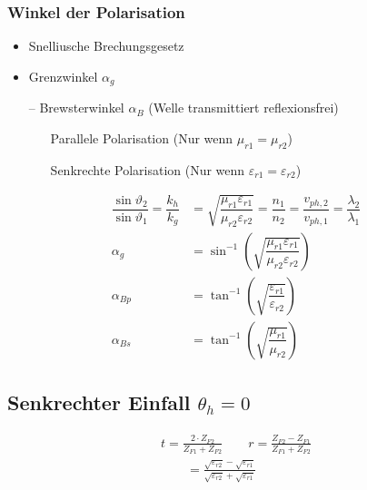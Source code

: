 


\subsubsection{Winkel der Polarisation}
\begin{itemize}
    \item Snelliusche Brechungsgesetz
    \item Grenzwinkel $\alpha_g$
    \item[--] Brewsterwinkel $\alpha_B$ (Welle transmittiert reflexionsfrei)
          \begin{itemize}
              \item[\textbullet] Parallele Polarisation (Nur wenn $\mu_{r1} = \mu_{r2}$)
              \item[\textbullet] Senkrechte Polarisation (Nur wenn $\varepsilon_{r1} = \varepsilon_{r2}$)
          \end{itemize}
\end{itemize}

\begin{align*}
    \dfrac{\sin \vartheta_{2}}{\sin \vartheta_{1}} = \dfrac{k_{h}}{k_{g}} & = \sqrt{\dfrac{\mu_{r 1} \varepsilon_{r 1}}{\mu_{r 2} \varepsilon_{r 2}}} = \dfrac{n_{1}}{n_{2}} = \dfrac{v_{p h, 2}}{v_{p h, 1}} = \dfrac{\lambda_{2}}{\lambda_{1}} \\
    \alpha_g                                                              & = \sin^{-1} \left( \sqrt{ \dfrac{\mu_{r1} \varepsilon_{r1}}{\mu_{r2} \varepsilon_{r2}}} \right)                                                                      \\
    \alpha_{Bp}                                                           & = \tan^{-1} \left( \sqrt{ \dfrac{\varepsilon_{r1}}{\varepsilon_{r2}}} \right)                                                                                        \\
    \alpha_{Bs}                                                           & = \tan^{-1} \left( \sqrt{ \dfrac{\mu_{r1}}{\mu_{r2}}} \right)
\end{align*}

\subsection{Senkrechter Einfall $ \theta_h = 0$ }



\begin{align*}
    t  = \frac{2 \cdot Z_{F2}}{Z_{F1} + Z_{F2}}\qquad r  = \frac{Z_{F2} - Z_{F1}}{Z_{F1} + Z_{F2}} \\
    \qquad = \frac{\sqrt{\varepsilon_{r2}}-\sqrt{\varepsilon_{r1}}}{\sqrt{\varepsilon_{r2}}+\sqrt{\varepsilon_{r1}}}
\end{align*}

